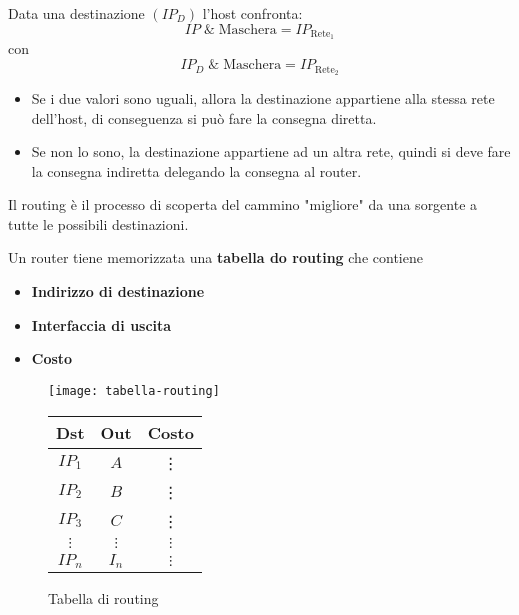 \documentclass[a4paper]{article}
\begin{document}
\noindent
Data una destinazione \( \left( IP_D \right)  \) l'host confronta:
\[
  IP \;\& \;\text{Maschera} = IP_{\text{Rete}_1}
\] 
con
\[
  IP_D \;\& \;\text{Maschera} = IP_{\text{Rete}_2}
\] 
\begin{itemize}
  \item 
    Se i due valori sono uguali, allora la destinazione appartiene alla stessa rete dell'host,
    di conseguenza si può fare la consegna diretta.

  \item 
    Se non lo sono, la destinazione appartiene ad un altra rete, quindi si deve fare la
    consegna indiretta delegando la consegna al router.
\end{itemize}

\begin{definition}
  Il routing è il processo di scoperta del cammino "migliore" da una sorgente a tutte
  le possibili destinazioni.
\end{definition}

\noindent
Un router tiene memorizzata una \textbf{tabella do routing} che contiene
\begin{itemize}
  \item \textbf{Indirizzo di destinazione}
  \item \textbf{Interfaccia di uscita}
  \item \textbf{Costo}
\end{itemize}
\begin{figure}[H]
  \centering
  \texttt{[image: tabella-routing]}
  \begin{tabular}{c|c|c}
    \textbf{Dst} & \textbf{Out} & \textbf{Costo} \\
    \hline
    \( IP_1 \) & \( A \) & \vdots \\
    \( IP_2 \) & \( B \) & \vdots \\
    \( IP_3 \) & \( C \) & \vdots \\
    \( \vdots \) & \( \vdots \) & \( \vdots \) \\
    \( IP_n \) & \( I_n \) & \( \vdots \)
  \end{tabular}
  \caption{Tabella di routing}
\end{figure}
\end{document}
